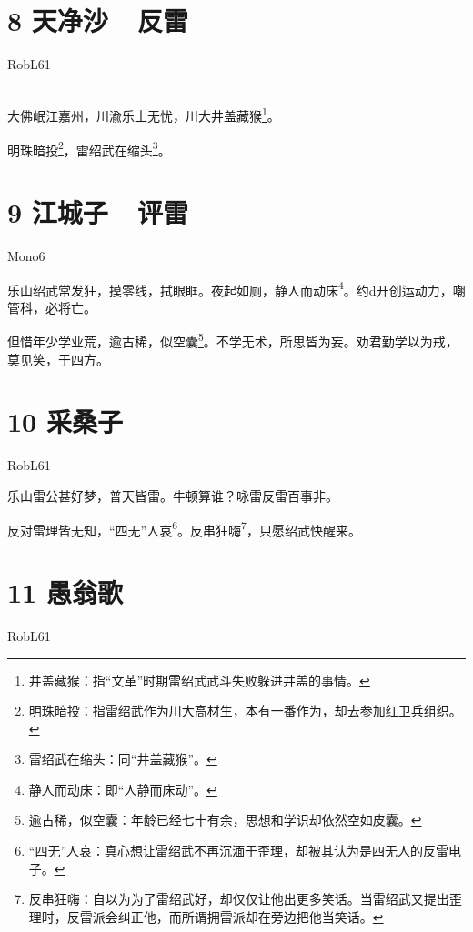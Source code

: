 \documentclass[UTF8,12pt,oneside]{ctexbook}
\begin{document}
    \newpage
    
    \section{8 天净沙\ \ 反雷}
    \begin{center}
        RobL61
        
        ~\\
        
        大佛岷江嘉州，川渝乐土无忧，川大井盖藏猴\footnote{井盖藏猴：指“文革”时期雷绍武武斗失败躲进井盖的事情。}。
       
        明珠暗投\footnote{明珠暗投：指雷绍武作为川大高材生，本有一番作为，却去参加红卫兵组织。}，雷绍武在缩头\footnote{雷绍武在缩头：同“井盖藏猴”。}。
    \end{center}
    
    \section{9 江城子\ \ 评雷}
    \begin{center}
        Mono6
        
    \end{center}
       
       乐山绍武常发狂，摸零线，拭眼眶。夜起如厕，静人而动床\footnote{静人而动床：即“人静而床动”。}。约d开创运动力，嘲管科，必将亡。    
       
       但惜年少学业荒，逾古稀，似空囊\footnote{逾古稀，似空囊：年龄已经七十有余，思想和学识却依然空如皮囊。}。不学无术，所思皆为妄。劝君勤学以为戒，莫见笑，于四方。
    
    \section{10 采桑子}
    \begin{center}
        RobL61
    \end{center}
       
        乐山雷公甚好梦，普天皆雷。牛顿算谁？咏雷反雷百事非。
       
       反对雷理皆无知，“四无”人哀\footnote{“四无”人哀：真心想让雷绍武不再沉湎于歪理，却被其认为是四无人的反雷电子。}。反串狂嗨\footnote{反串狂嗨：自以为为了雷绍武好，却仅仅让他出更多笑话。当雷绍武又提出歪理时，反雷派会纠正他，而所谓拥雷派却在旁边把他当笑话。}，只愿绍武快醒来。
       
    \newpage 
    
    \section{11 愚翁歌}
    \begin{center}
        RobL61
        
    \end{center}
    
\end{document}
